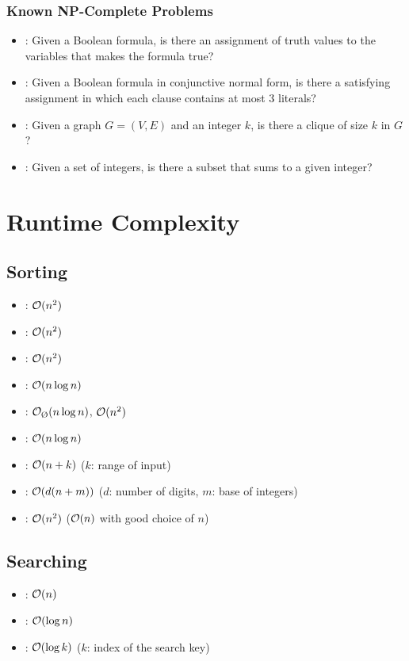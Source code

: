 \documentclass{article}
\begin{document}
\subsubsection{Known NP-Complete Problems}
\begin{itemize}
  \item {}: Given a Boolean formula, is there an assignment of truth values to the variables that makes the formula true?
  \item {}: Given a Boolean formula in conjunctive normal form, is there a satisfying assignment in which each clause contains at most 3 literals?
  \item {}: Given a graph $G = (V,E)$ and an integer $k$, is there a clique of size $k$ in $G$?
  \item {}: Given a set of integers, is there a subset that sums to a given integer?
\end{itemize}



\section{Runtime Complexity}
\subsection{Sorting}
\begin{itemize}
  \item {}: $\mathcal{O}(n^2)$
  \item {}: $\mathcal{O}(n^2)$
  \item {}: $\mathcal{O}(n^2)$
  \item {}: $\mathcal{O}(n\log n)$
  \item {}: $\bigO_\text{\O}(n\log n)$, $\mathcal{O}(n^2)$
  \item {}: $\mathcal{O}(n\log n)$
  \item {}: $\mathcal{O}(n+k)$ ($k$: range of input)
  \item {}: $\mathcal{O}(d(n+m))$ ($d$: number of digits, $m$: base of integers)
  \item {}: $\mathcal{O}(n^2)$ ($\mathcal{O}(n)$ with good choice of $n$)
\end{itemize}

\subsection{Searching}
\begin{itemize}
  \item {}: $\mathcal{O}(n)$
  \item {}: $\mathcal{O}(\log n)$
  \item {}: $\mathcal{O}(\log k)$ ($k$: index of the search key)
\end{itemize}
\end{document}

